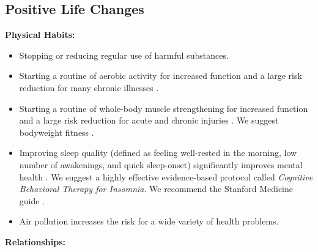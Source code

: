 \documentclass[12pt,letterpaper]{article}
\begin{document}
\subsection{Positive Life Changes}
\label{sec:lifechanges}
\noindent \textbf{Physical Habits:}
\begin{itemize}
    \item Stopping or reducing regular use of harmful substances.
    \item Starting a routine of aerobic activity for increased function and a large risk reduction for many chronic illnesses \cite{liebermanExercised}. 
    \item Starting a routine of whole-body muscle strengthening for increased function and a large risk reduction for acute and chronic injuries \cite{lauersenStrength}. We suggest bodyweight fitness \cite{lowBodyweight}.  
    \item Improving sleep quality (defined as feeling well-rested in the morning, low number of awakenings, and quick sleep-onset) significantly improves mental health \cite{scottSleep}. We suggest a highly effective evidence-based protocol called \textit{Cognitive Behavioral Therapy for Insomnia}. We recommend the Stanford Medicine guide \cite{stanfordSleep}.
    \item Air pollution increases the risk for a wide variety of health problems.
\end{itemize}
\noindent \textbf{Relationships:}
\end{document}
